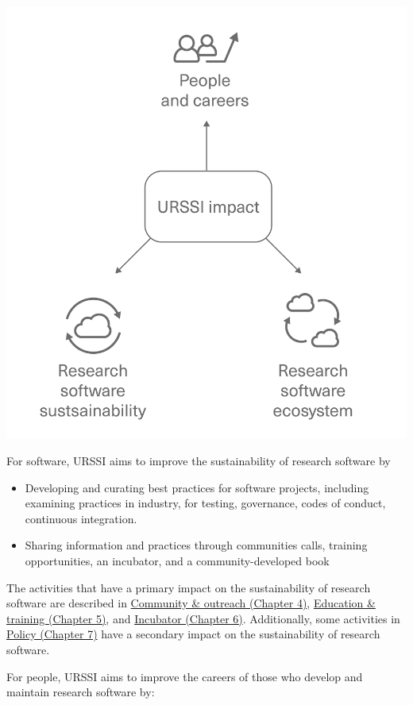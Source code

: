 \documentclass[
]{book}
\begin{document}
\includegraphics{images/URSSI-impact-drawing.png}

For software, URSSI aims to improve the sustainability of research software by

\begin{itemize}
\item
  Developing and curating best practices for software projects,
  including examining practices in industry,
  for testing, governance, codes of conduct, continuous integration.
\item
  Sharing information and practices through communities calls, training
  opportunities, an incubator, and a community-developed book
\end{itemize}

The activities that have a primary impact on the sustainability of research software are described in
\href{Ch-Comm}{Community \& outreach (Chapter 4)},
\href{Ch-Edu}{Education \& training (Chapter 5)}, and
\href{Ch-Incubator}{Incubator (Chapter 6)}.
Additionally, some activities in
\href{Ch-Policy}{Policy (Chapter 7)} have a secondary impact
on the sustainability of research software.

For people, URSSI aims to improve the careers of those who develop and maintain
research software by:
\end{document}
